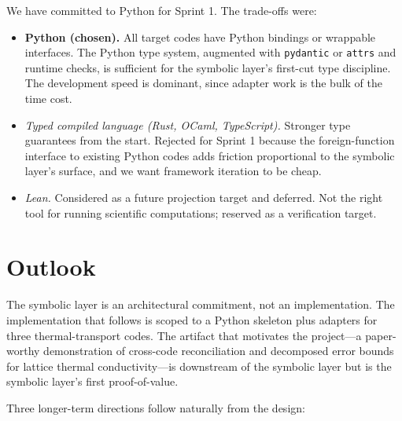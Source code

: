 \documentclass[11pt,a4paper]{article}
\begin{document}
We have committed to Python for Sprint 1. The trade-offs were:

\begin{itemize}[leftmargin=2em]
  \item \textbf{Python (chosen).} All target codes have Python bindings or wrappable interfaces.
        The Python type system, augmented with \texttt{pydantic} or \texttt{attrs} and runtime
        checks, is sufficient for the symbolic layer's first-cut type discipline. The development
        speed is dominant, since adapter work is the bulk of the time cost.
  \item \emph{Typed compiled language (Rust, OCaml, TypeScript).} Stronger type guarantees from
        the start. Rejected for Sprint 1 because the foreign-function interface to existing
        Python codes adds friction proportional to the symbolic layer's surface, and we want
        framework iteration to be cheap.
  \item \emph{Lean.} Considered as a future projection target and deferred. Not the right tool for
        running scientific computations; reserved as a verification target.
\end{itemize}

\section{Outlook}
\label{sec:outlook}

The symbolic layer is an architectural commitment, not an implementation. The implementation that
follows is scoped to a Python skeleton plus adapters for three thermal-transport codes. The
artifact that motivates the project---a paper-worthy demonstration of cross-code reconciliation
and decomposed error bounds for lattice thermal conductivity---is downstream of the symbolic layer but
is the symbolic layer's first proof-of-value.

Three longer-term directions follow naturally from the design:
\end{document}
